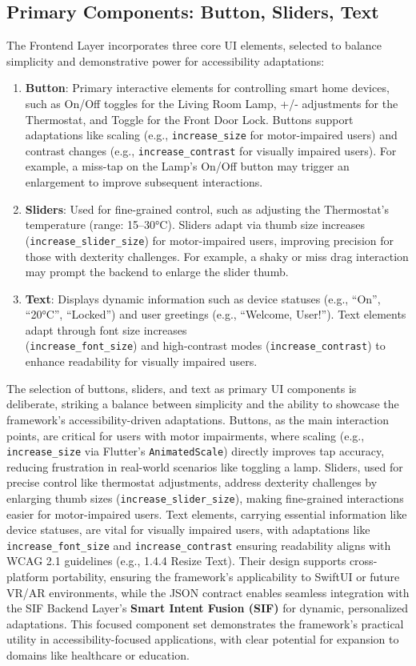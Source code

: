 \documentclass[openany]{book}
\begin{document}
    \subsection{Primary Components: Button, Sliders, Text}
    The Frontend Layer incorporates three core UI elements, selected to balance simplicity and demonstrative power for accessibility adaptations:
\begin{enumerate}
    \item \textbf{Button}: Primary interactive elements for controlling smart home devices, such as On/Off toggles for the Living Room Lamp, +/- adjustments for the Thermostat, and Toggle for the Front Door Lock. Buttons support adaptations like scaling (e.g., \verb|increase_size| for motor-impaired users) and contrast changes (e.g., \verb|increase_contrast| for visually impaired users). For example, a miss-tap on the Lamp’s On/Off button may trigger an enlargement to improve subsequent interactions.
    \item \textbf{Sliders}: Used for fine-grained control, such as adjusting the Thermostat’s temperature (range: 15–30°C). Sliders adapt via thumb size increases (\verb|increase_slider_size|) for motor-impaired users, improving precision for those with dexterity challenges. For example, a shaky or miss drag interaction may prompt the backend to enlarge the slider thumb.
    \item \textbf{Text}: Displays dynamic information such as device statuses (e.g., “On”, “20°C”, “Locked”) and user greetings (e.g., “Welcome, User!”). Text elements adapt through font size increases \\
    (\verb|increase_font_size|) and high-contrast modes (\verb|increase_contrast|) to enhance readability for visually impaired users.
\end{enumerate}
    The selection of buttons, sliders, and text as primary UI components is deliberate, striking a balance between simplicity and the ability to showcase the framework’s accessibility-driven adaptations. Buttons, as the main interaction points, are critical for users with motor impairments, where scaling (e.g., \texttt{increase\_size} via Flutter’s \texttt{AnimatedScale}) directly improves tap accuracy, reducing frustration in real-world scenarios like toggling a lamp. Sliders, used for precise control like thermostat adjustments, address dexterity challenges by enlarging thumb sizes (\texttt{increase\_slider\_size}), making fine-grained interactions easier for motor-impaired users. Text elements, carrying essential information like device statuses, are vital for visually impaired users, with adaptations like \texttt{increase\_font\_size} and \texttt{increase\_contrast} ensuring readability aligns with WCAG 2.1 guidelines (e.g., 1.4.4 Resize Text). Their design supports cross-platform portability, ensuring the framework’s applicability to SwiftUI or future VR/AR environments, while the JSON contract enables seamless integration with the SIF Backend Layer’s \textbf{Smart Intent Fusion (SIF)} for dynamic, personalized adaptations. This focused component set demonstrates the framework’s practical utility in accessibility-focused applications, with clear potential for expansion to domains like healthcare or education.
    
\end{document}
